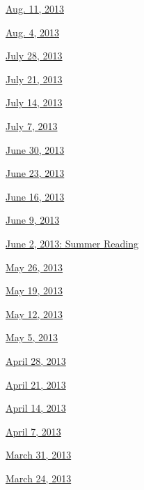 \href{http://www.nytimes.com/indexes/2013/08/11/books/review/index.html}{Aug.
11, 2013}

\href{http://www.nytimes.com/indexes/2013/08/04/books/review/index.html}{Aug.
4, 2013}

\href{http://www.nytimes.com/indexes/2013/07/28/books/review/index.html}{July
28, 2013}

\href{http://www.nytimes.com/indexes/2013/07/21/books/review/index.html}{July
21, 2013}

\href{http://www.nytimes.com/indexes/2013/07/14/books/review/index.html}{July
14, 2013}

\href{http://www.nytimes.com/indexes/2013/07/07/books/review/index.html}{July
7, 2013}

\href{http://www.nytimes.com/indexes/2013/06/30/books/review/index.html}{June
30, 2013}

\href{http://www.nytimes.com/indexes/2013/06/23/books/review/index.html}{June
23, 2013}

\href{http://www.nytimes.com/indexes/2013/06/16/books/review/index.html}{June
16, 2013}

\href{http://www.nytimes.com/indexes/2013/06/09/books/review/index.html}{June
9, 2013}

\href{http://www.nytimes.com/indexes/2013/06/02/books/review/index.html}{June
2, 2013: Summer Reading}

\href{http://www.nytimes.com/indexes/2013/05/26/books/review/index.html}{May
26, 2013}

\href{http://www.nytimes.com/indexes/2013/05/19/books/review/index.html}{May
19, 2013}

\href{http://www.nytimes.com/indexes/2013/05/12/books/review/index.html}{May
12, 2013}

\href{http://www.nytimes.com/indexes/2013/05/05/books/review/index.html}{May
5, 2013}

\href{http://www.nytimes.com/indexes/2013/04/28/books/review/index.html}{April
28, 2013}

\href{http://www.nytimes.com/indexes/2013/04/21/books/review/index.html}{April
21, 2013}

\href{http://www.nytimes.com/indexes/2013/04/14/books/review/index.html}{April
14, 2013}

\href{http://www.nytimes.com/indexes/2013/04/07/books/review/index.html}{April
7, 2013}

\href{http://www.nytimes.com/indexes/2013/03/31/books/review/index.html}{March
31, 2013}

\href{http://www.nytimes.com/indexes/2013/03/24/books/review/index.html}{March
24, 2013}

